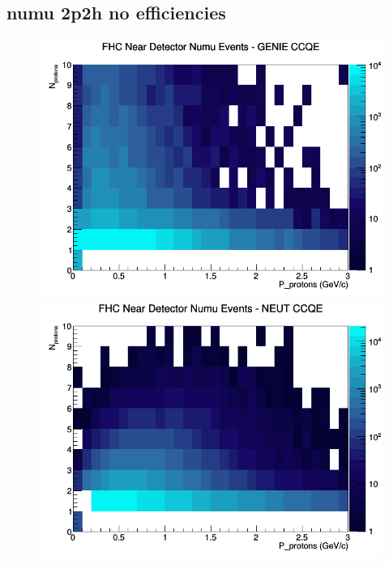\subsection{numu 2p2h no efficiencies}
\begin{figure}[h]
\includegraphics[width=\linewidth]{N_P/nominal/protons/CCQE_FHC_ND_numu_N_P_GENIE.png}
\endminipage
{}
\includegraphics[width=\linewidth]{N_P/nominal/protons/CCQE_FHC_ND_numu_N_P_NEUT.png}
\endminipage
{}

\end{figure}
